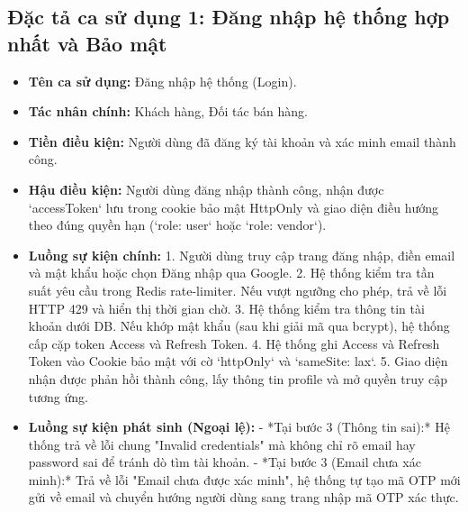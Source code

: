 \documentclass[../DoAn.tex]{subfiles}
\begin{document}
\subsection{Đặc tả ca sử dụng 1: Đăng nhập hệ thống hợp nhất và Bảo mật}
\begin{itemize}
\item \textbf{Tên ca sử dụng:} Đăng nhập hệ thống (Login).
\item \textbf{Tác nhân chính:} Khách hàng, Đối tác bán hàng.
\item \textbf{Tiền điều kiện:} Người dùng đã đăng ký tài khoản và xác minh email thành công.
\item \textbf{Hậu điều kiện:} Người dùng đăng nhập thành công, nhận được `accessToken` lưu trong cookie bảo mật HttpOnly và giao diện điều hướng theo đúng quyền hạn (`role: user` hoặc `role: vendor`).
\item \textbf{Luồng sự kiện chính:}
  1. Người dùng truy cập trang đăng nhập, điền email và mật khẩu hoặc chọn Đăng nhập qua Google.
  2. Hệ thống kiểm tra tần suất yêu cầu trong Redis rate-limiter. Nếu vượt ngưỡng cho phép, trả về lỗi HTTP 429 và hiển thị thời gian chờ.
  3. Hệ thống kiểm tra thông tin tài khoản dưới DB. Nếu khớp mật khẩu (sau khi giải mã qua bcrypt), hệ thống cấp cặp token Access và Refresh Token.
  4. Hệ thống ghi Access và Refresh Token vào Cookie bảo mật với cờ `httpOnly` và `sameSite: lax`.
  5. Giao diện nhận được phản hồi thành công, lấy thông tin profile và mở quyền truy cập tương ứng.
\item \textbf{Luồng sự kiện phát sinh (Ngoại lệ):}
  - *Tại bước 3 (Thông tin sai):* Hệ thống trả về lỗi chung "Invalid credentials" mà không chỉ rõ email hay password sai để tránh dò tìm tài khoản.
  - *Tại bước 3 (Email chưa xác minh):* Trả về lỗi "Email chưa được xác minh", hệ thống tự tạo mã OTP mới gửi về email và chuyển hướng người dùng sang trang nhập mã OTP xác thực.
\end{itemize}
\end{document}
